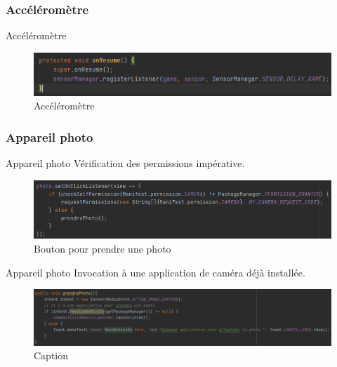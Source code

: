 \documentclass[t,12pt]{beamer}
\begin{document}
\subsubsection{Accéléromètre}
\begin{frame}{Accéléromètre}

\begin{figure}
    \centering
    \includegraphics[width=1\linewidth]{images/accéléro.png}
    \caption{Accéléromètre}
    \label{fig:accelero}
\end{figure}
    
\end{frame}

\subsubsection{Appareil photo}
\begin{frame}{Appareil photo}
    Vérification des permissions impérative.
    \begin{figure}
     \centering
     \centering
     \includegraphics[scale=0.5]{clickPhoto}
     \caption{Bouton pour prendre une photo}
     \label{fig:Bouton photo}
    \end{figure}
\end{frame}

\begin{frame}{Appareil photo}
    Invocation à une application de caméra déjà installée.
    \begin{figure}
        \centering
        \includegraphics[scale=0.4]{takePhoto}
        \caption{Caption}
        \label{fig:my_label}
    \end{figure}
\end{frame}
\end{document}
